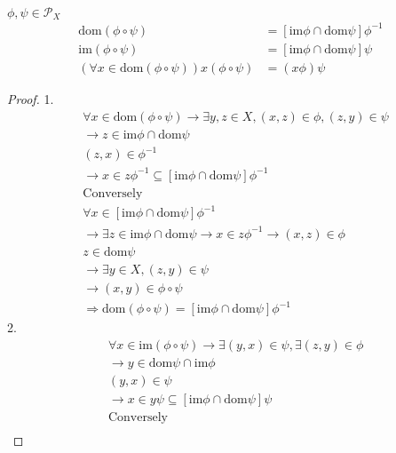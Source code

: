 \begin{Prop}\label{Prop:1.4.3}
    $\phi, \psi \in \mathcal{P}_X$
    \begin{align*}
        \mathrm{dom}(\phi \circ \psi) &= [\mathrm{im} \phi \cap \mathrm{dom}\psi]\phi^{-1}     \\
        \mathrm{im}(\phi \circ \psi) &= [\mathrm{im} \phi \cap \mathrm{dom}\psi]\psi   \\
        (\forall x \in \mathrm{dom}(\phi \circ \psi))x(\phi \circ \psi) &= (x\phi)\psi
    \end{align*}
    \begin{proof}
        1.
        \begin{align*}
            &\forall x\in \mathrm{dom}(\phi\circ \psi ) \rightarrow \exists y,z \in X,(x,z)\in \phi ,(z,y)\in \psi \\
            &\rightarrow z\in \mathrm{im}\phi \cap \mathrm{dom} \psi \\
            &(z,x) \in \phi^{-1}    \\
            &\rightarrow x \in z \phi^{-1} \subseteq [\mathrm{im}\phi \cap \mathrm{dom} \psi ]\phi^{-1} \\
            &\text{Conversely}  \\
            &\forall x\in [\mathrm{im}\phi \cap \mathrm{dom}\psi ]\phi^{-1} \\
            &\rightarrow \exists z\in \mathrm{im}\phi \cap \mathrm{dom}\psi \rightarrow x \in z\phi^{-1} \rightarrow (x,z)\in \phi     \\
            &z\in \mathrm{dom}\psi \\
            &\rightarrow \exists y \in X,(z,y)\in \psi \\
            &\rightarrow (x,y)\in \phi \circ \psi   \\
            &\Rightarrow \mathrm{dom}(\phi \circ \psi )=[\mathrm{im}\phi \cap \mathrm{dom}\psi ]\phi^{-1}
        \end{align*}
        2.
        \begin{align*}
            &\forall x \in \mathrm{im}(\phi \circ \psi)\rightarrow \exists (y,x)\in \psi ,\exists (z,y) \in \phi \\
            &\rightarrow y \in \mathrm{dom}\psi \cap \mathrm{im}\phi    \\
            &(y,x)\in \psi \\
            &\rightarrow x \in y\psi \subseteq [\mathrm{im}\phi \cap \mathrm{dom}\psi ]\psi     \\
            &\text{Conversely}  \\

\end{align*}
\end{proof}
\end{Prop}
